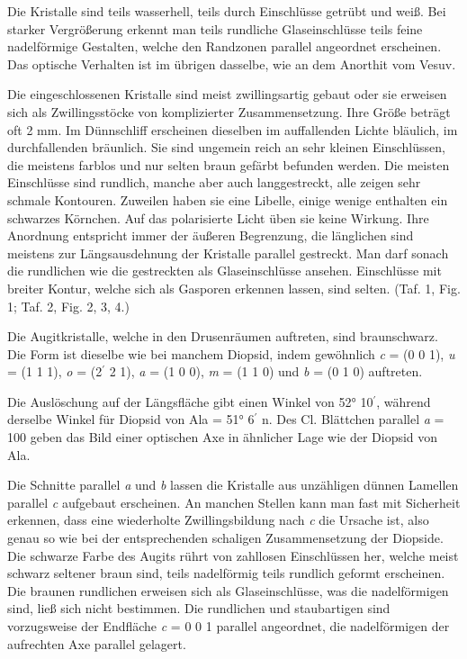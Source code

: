 \documentclass[a4paper, 12pt, oneside]{article}
\begin{document}
Die Kristalle sind teils wasserhell, teils durch Einschlüsse getrübt und weiß. Bei starker Vergrößerung erkennt man teils rundliche Glaseinschlüsse teils feine nadelförmige Gestalten, welche den Randzonen parallel angeordnet erscheinen. Das optische Verhalten ist im übrigen dasselbe, wie an dem Anorthit vom Vesuv.

Die eingeschlossenen Kristalle sind meist zwillingsartig gebaut oder sie erweisen sich als Zwillingsstöcke von komplizierter Zusammensetzung. Ihre Größe beträgt oft 2 mm. Im Dünnschliff erscheinen dieselben im auffallenden Lichte bläulich, im durchfallenden bräunlich. Sie sind ungemein reich an sehr kleinen Einschlüssen, die meistens farblos und nur selten braun gefärbt befunden werden. Die meisten Einschlüsse sind rundlich, manche aber auch langgestreckt, alle zeigen sehr schmale Kontouren. Zuweilen haben sie eine Libelle, einige wenige enthalten ein schwarzes Körnchen. Auf das polarisierte Licht üben sie keine Wirkung. Ihre Anordnung entspricht immer der äußeren Begrenzung, die länglichen sind meistens zur Längsausdehnung der Kristalle parallel gestreckt. Man darf sonach die rundlichen wie die gestreckten als Glaseinschlüsse ansehen. Einschlüsse mit breiter Kontur, welche sich als Gasporen erkennen lassen, sind selten. (Taf. 1, Fig. 1; Taf. 2, Fig. 2, 3, 4.)

Die Augitkristalle, welche in den Drusenräumen auftreten, sind braunschwarz. Die Form ist dieselbe wie bei manchem Diopsid, indem gewöhnlich \emph{c} = (0 0 1), \emph{u} = (1 1 1), \emph{o} = (2$^{\prime}$ 2 1), \emph{a} = (1 0 0), \emph{m} = (1 1 0) und \emph{b} = (0 1 0) auftreten.

Die Auslöschung auf der Längsfläche gibt einen Winkel von 52° 10$^{\prime}$, während derselbe Winkel für Diopsid von Ala = 51° 6$^{\prime}$ n. Des Cl. Blättchen parallel \emph{a} = 100 geben das Bild einer optischen Axe in ähnlicher Lage wie der Diopsid von Ala.

Die Schnitte parallel \emph{a} und \emph{b} lassen die Kristalle aus unzähligen dünnen Lamellen parallel \emph{c} aufgebaut erscheinen. An manchen Stellen kann man fast mit Sicherheit erkennen, dass eine wiederholte Zwillingsbildung nach \emph{c} die Ursache ist, also genau so wie bei der entsprechenden schaligen Zusammensetzung der Diopside. Die schwarze Farbe des Augits rührt von zahllosen Einschlüssen her, welche meist schwarz seltener braun sind, teils nadelförmig teils rundlich geformt erscheinen. Die braunen rundlichen erweisen sich als Glaseinschlüsse, was die nadelförmigen sind, ließ sich nicht bestimmen. Die rundlichen und staubartigen sind vorzugsweise der Endfläche \emph{c} = 0 0 1 parallel angeordnet, die nadelförmigen der aufrechten Axe parallel gelagert.
\end{document}
